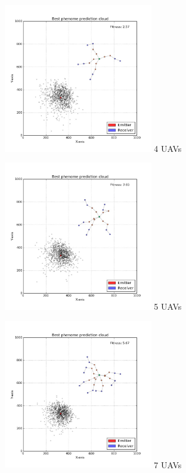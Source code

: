 \documentclass[10pt,a4paper]{book}
\begin{document}
\begin{figure}[H]
\centering
\begin{minipage}{60mm}
  \centering
  \includegraphics[width=65mm]{incr2steps/4uavs.jpg}
  4 \glspl{UAV}
\end{minipage}%
\begin{minipage}{60mm}
  \centering
  \includegraphics[width=65mm]{incr2steps/5uavs.jpg}
  5 \glspl{UAV}
\end{minipage}
\begin{minipage}{60mm}
  \centering
  \includegraphics[width=65mm]{incr2steps/7uavs.jpg}
  7 \glspl{UAV}
\end{minipage}
\begin{minipage}{60mm}

\end{minipage}
\end{figure}
\end{document}
